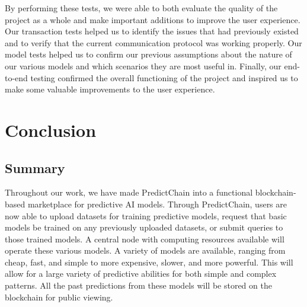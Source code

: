 \documentclass{ledger}
\begin{document}
By performing these tests, we were able to both evaluate the quality of the project as a whole and make important
additions to improve the user experience.  Our transaction tests helped us to identify the issues that had
previously existed and to verify that the current communication protocol was working properly.  Our model tests
helped us to confirm our previous assumptions about the nature of our various models and which scenarios they are
most useful in.  Finally, our end-to-end testing confirmed the overall functioning of the project and inspired us
to make some valuable improvements to the user experience.

\section{Conclusion}

\subsection{Summary}

Throughout our work, we have made PredictChain into a functional blockchain-based marketplace for predictive AI models.
Through PredictChain, users are now able to upload datasets for training predictive models, request that basic models
be trained on any previously uploaded datasets, or submit queries to those trained models.
A central node with computing resources available will operate these various models. A variety of
models are available, ranging from cheap, fast, and simple to more expensive, slower, and more powerful.
This will allow for a large variety of predictive abilities for both simple and complex patterns.  All the past predictions
from these models will be stored on the blockchain for public viewing.

%
%
%
\end{document}
